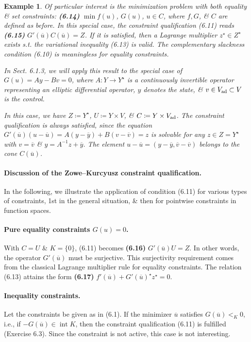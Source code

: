 \documentclass[oneside]{book}
\numberwithin{equation}{section}
\newtheorem{example}{Example}[chapter]
\begin{document}
\begin{example}
	Of particular interest is the minimization problem with both equality \& set constraints: \textbf{(6.14)} $\min f(u)$, $G(u)$, $u\in C$, where $f,G$, \& $C$ are defined as before. In this special case, the constraint qualification (6.11) reads \textbf{(6.15)} $G'(\overline{u})C(\overline{u}) = Z$. If it is satisfied, then a Lagrange multiplier $z^\star\in Z^\star$ exists s.t. the variational inequality (6.13) is valid. The complementary slackness condition (6.10) is meaningless for equality constraints.
	
	In Sect. 6.1.3, we will apply this result to the special case of $G(u) = Ay - Bv = 0$, where $A:Y\to Y^\star$ is a continuously invertible operator representing an elliptic differential operator, $y$ denotes the state, \& $v\in V_{\rm ad}\subset V$ is the control.
	
	In this case, we have $Z\coloneqq Y^\star$, $U\coloneqq Y\times V$, \& $C\coloneqq Y\times V_{\rm ad}$. The constraint qualification is always satisfied, since the equation $G'(\overline{u})(u - \overline{u}) = A(y - \overline{y}) + B(v - \overline{v}) = z$ is solvable for any $z\in Z = Y^\star$ with $v = \overline{v}$ \& $y = A^{-1}z + \overline{y}$. The element $u - \overline{u} = (y - \overline{y},\overline{v} - \overline{v})$ belongs to the cone $C(\overline{u})$.
\end{example}

\paragraph{Discussion of the Zowe--Kurcyusz constraint qualification.} In the following, we illustrate the application of condition (6.11) for various types of constraints, 1st in the general situation, \& then for pointwise constraints in function spaces.

\paragraph{Pure equality constraints $G(u) = 0$.} With $C = U$ \& $K = \{0\}$, (6.11) becomes \textbf{(6.16)} $G'(\overline{u})U = Z$. In other words, the operator $G'(\overline{u})$ must be surjective. This surjectivity requirement comes from the classical Lagrange multiplier rule for equality constraints. The relation (6.13) attains the form \textbf{(6.17)} $f'(\overline{u}) + G'(\overline{u})^\star z^\star = 0$.

\paragraph{Inequality constraints.} Let the constraints be given as in (6.1). If the minimizer $\overline{u}$ satisfies $G(\overline{u}) <_K 0$, i.e., if $-G(\overline{u})\in\operatorname{int}K$, then the constraint qualification (6.11) is fulfilled (Exercise 6.3). Since the constraint is not active, this case is not interesting.
\end{document}
